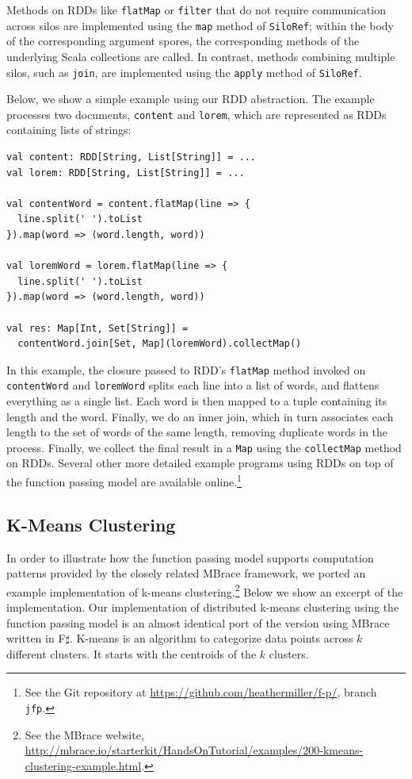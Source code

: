 \documentclass{jfp1}
\begin{document}
Methods on RDDs like \verb|flatMap| or \verb|filter| that do not
require communication across silos are implemented using the
\verb|map| method of \verb|SiloRef|; within the body of the
corresponding argument spores, the corresponding methods of the
underlying Scala collections are called. In contrast, methods
combining multiple silos, such as \verb|join|, are implemented using
the \verb|apply| method of \verb|SiloRef|.

Below, we show a simple example using our RDD abstraction. The example
processes two documents, \verb|content| and \verb|lorem|, which are
represented as RDDs containing lists of strings:

\begin{lstlisting}
val content: RDD[String, List[String]] = ...
val lorem: RDD[String, List[String]] = ...

val contentWord = content.flatMap(line => {
  line.split(' ').toList
}).map(word => (word.length, word))

val loremWord = lorem.flatMap(line => {
  line.split(' ').toList
}).map(word => (word.length, word))

val res: Map[Int, Set[String]] =
  contentWord.join[Set, Map](loremWord).collectMap()
\end{lstlisting}
\noindent
In this example, the closure passed to RDD's \verb|flatMap| method
invoked on \verb|contentWord| and \verb|loremWord| splits each line
into a list of words, and flattens everything as a single list. Each
word is then mapped to a tuple containing its length and the
word. Finally, we do an inner join, which in turn associates each
length to the set of words of the same length, removing duplicate
words in the process. Finally, we collect the final result in a
\verb|Map| using the \verb|collectMap| method on RDDs. Several other
more detailed example programs using RDDs on top of the function
passing model are available online.\footnote{See the Git repository at
  \url{https://github.com/heathermiller/f-p/}, branch \texttt{jfp}.}

\subsection{K-Means Clustering}\label{sec:mbrace}

In order to illustrate how the function passing model supports
computation patterns provided by the closely related MBrace framework,
we ported an example implementation of k-means
clustering.\footnote{See the MBrace website,
  \url{http://mbrace.io/starterkit/HandsOnTutorial/examples/200-kmeans-clustering-example.html}.}
Below we show an excerpt of the implementation. Our implementation of
distributed k-means clustering using the function passing model is an
almost identical port of the version using MBrace written in
F$\sharp$. K-means is an algorithm to categorize data points across
$k$ different clusters. It starts with the centroids of the $k$
clusters.
\end{document}
